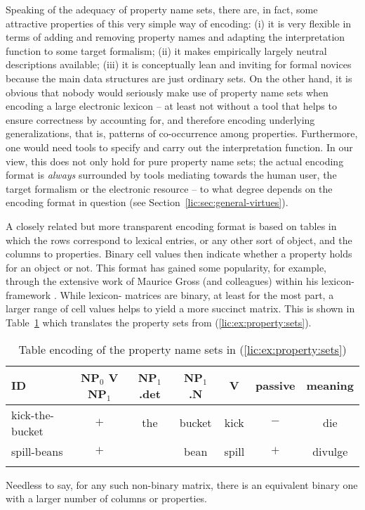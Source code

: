 \documentclass[output=paper
,modfonts
,nonflat
,biblatexbackend=biber
]{langsci/langscibook}
\begin{document}
Speaking of the adequacy of property name sets, there are, in fact, some attractive properties of this very simple way of encoding: (i) it is very flexible in terms of adding and removing property names and adapting the interpretation function to some target formalism; (ii) it makes empirically largely neutral descriptions available; (iii) it is conceptually lean and inviting for formal novices because the main data structures are just ordinary sets. On the other hand, it is obvious that nobody would seriously make use of property name sets when encoding a large electronic lexicon -- at least not without a tool that helps to ensure correctness by accounting for, and therefore encoding underlying generalizations, that is, patterns of co-occurrence among properties. Furthermore, one would need tools to specify and carry out the interpretation function. In our view, this does not only hold for pure property name sets; the actual encoding format is \textit{always} surrounded by tools mediating towards the human user, the target formalism or the electronic resource -- to what degree depends on the encoding format in question (see Section~\ref{lic:sec:general-virtues}).

A closely related but more transparent encoding format is based on tables in which the rows correspond to lexical entries, or any other sort of object, and the columns to properties. Binary cell values then indicate whether a property holds for an object or not. This format has gained some popularity, for example, through the extensive work of Maurice Gross (and colleagues) within his lexicon- framework \citep{gross:94}. While lexicon- matrices are binary, at least for the most part, a larger range of cell values helps to yield a more succinct matrix. This is shown in Table~\ref{lic:tab:table-encoding} which translates the property sets from (\ref{lic:ex:property:sets}). 
\begin{table}[tp]
  \small
  \begin{tabular}{lcccccc}
    \lsptoprule
    ID              & NP$_{\text{0}}$ V NP$_{\text{1}}$ & NP$_{\text{1}}$.det & NP$_{\text{1}}$.N & V     & passive & meaning \\  
    \midrule
    kick-the-bucket & $+$                                 & the                 & bucket            & kick  & $-$       & die     \\
    spill-beans     & $+$                                 &                     & bean              & spill & $+$       & divulge \tabularnewline %
    \lspbottomrule
  \end{tabular}
  \caption{Table encoding of the property name sets in (\ref{lic:ex:property:sets})}
  \label{lic:tab:table-encoding}
\end{table}
Needless to say, for any such non-binary matrix, there is an equivalent binary one with a larger number of columns or properties.
\end{document}
